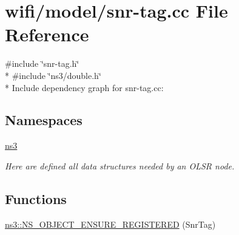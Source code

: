 \hypertarget{snr-tag_8cc}{}\section{wifi/model/snr-\/tag.cc File Reference}
\label{snr-tag_8cc}
{\ttfamily \#include \char`\"{}snr-\/tag.\+h\char`\"{}}\\*
{\ttfamily \#include \char`\"{}ns3/double.\+h\char`\"{}}\\*
Include dependency graph for snr-\/tag.cc\+:
\subsection*{Namespaces}
\begin{DoxyCompactItemize}
\item 
 \hyperlink{namespacens3}{ns3}
\begin{DoxyCompactList}\small\item\em Here are defined all data structures needed by an O\+L\+SR node. \end{DoxyCompactList}\end{DoxyCompactItemize}
\subsection*{Functions}
\begin{DoxyCompactItemize}
\item 
\hyperlink{namespacens3_ae996f8710cd0b6c2a9c2c54c59ad8c08}{ns3\+::\+N\+S\+\_\+\+O\+B\+J\+E\+C\+T\+\_\+\+E\+N\+S\+U\+R\+E\+\_\+\+R\+E\+G\+I\+S\+T\+E\+R\+ED} (Snr\+Tag)
\end{DoxyCompactItemize}
